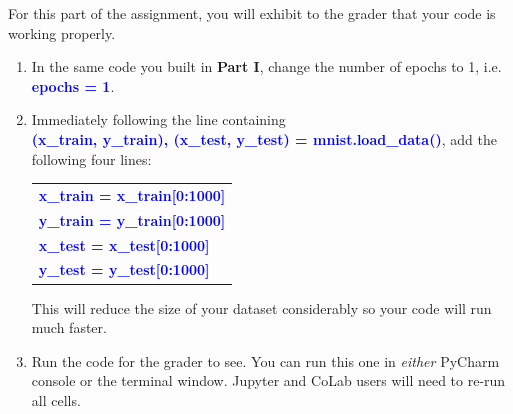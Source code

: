 \documentclass[12pt]{article}
\theoremstyle{plain}
\theoremstyle{definition}
\begin{document}
For this part of the assignment, you will exhibit to the grader that your code is working properly.
\begin{enumerate}
\item In the same code you built in \textbf{Part I}, change the number of epochs to 1, i.e. \textbf{\textcolor{blue}{epochs = 1}}.

\item Immediately following the line containing \\ \textbf{\textcolor{blue}{(x\_train, y\_train), (x\_test, y\_test) = mnist.load\_data()}}, add the following four lines:
\begin{center}
\begin{tabular}{l}
\textbf{\textcolor{blue}{x\_train = x\_train[0:1000] }} \\
\textbf{\textcolor{blue}{y\_train = y\_train[0:1000] }} \\
\textbf{\textcolor{blue}{x\_test = x\_test[0:1000] }} \\
\textbf{\textcolor{blue}{y\_test = y\_test[0:1000]  }} 
\end{tabular}
\end{center}

This will reduce the size of your dataset considerably so your code will run much faster.

\item Run the code for the grader to see. You can run this one in \textit{either} PyCharm console or the terminal window. Jupyter and CoLab users will need to re-run all cells. 
\end{enumerate}
\end{document}
